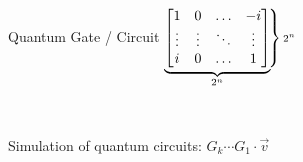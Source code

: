 \begin{frame}{Quantum Gate / Circuit}
$
\underbrace{
\begin{bmatrix}
1 & 0  & \dots & -i\\
\vdots  & \vdots  & \ddots& \vdots\\
i & 0  & \dots &  1\\
\end{bmatrix}
}_{2^n}
\left.
\hspace{-1ex}
\vphantom{
\begin{bmatrix}
1 & 0  & \dots & -i\\
\vdots  & \vdots  & \ddots& \vdots\\
i & 0  & \dots &  1\\
\end{bmatrix}}
\right\}\text{\scriptsize $2^n$}
$

~\\

\pause

Simulation of quantum circuits: $G_k \cdots G_1 \cdot \vec v$

\end{frame}




